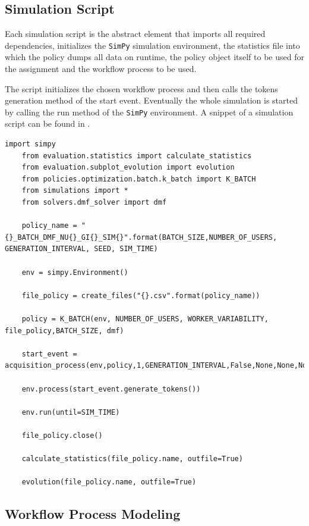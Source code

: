 \documentclass[draft=false]{seal_thesis}
\begin{document}
\subsection{Simulation Script}

Each simulation script is the abstract element that imports all required dependencies, initializes the \texttt{SimPy} simulation environment, the statistics file into which the policy dumps all data on runtime, the policy object itself to be used for the assignment and the workflow process to be used. 

The script initializes the chosen workflow process and then calls the tokens generation method of the start event. Eventually the whole simulation is started by calling the run method of the \texttt{SimPy} environment. A snippet of a simulation script can be found in .

\begin{lstlisting}[caption=Example of the structure of a simulation script. Here for the K-Batch policy using the \gls{dmf} solver,label=lst:simulation_script,style=CustomPython]
	import simpy
	from evaluation.statistics import calculate_statistics
	from evaluation.subplot_evolution import evolution
	from policies.optimization.batch.k_batch import K_BATCH
	from simulations import *
	from solvers.dmf_solver import dmf

	policy_name = "{}_BATCH_DMF_NU{}_GI{}_SIM{}".format(BATCH_SIZE,NUMBER_OF_USERS, GENERATION_INTERVAL, SEED, SIM_TIME)

	env = simpy.Environment()

	file_policy = create_files("{}.csv".format(policy_name))

	policy = K_BATCH(env, NUMBER_OF_USERS, WORKER_VARIABILITY, file_policy,BATCH_SIZE, dmf)

	start_event = acquisition_process(env,policy,1,GENERATION_INTERVAL,False,None,None,None)

	env.process(start_event.generate_tokens())

	env.run(until=SIM_TIME)

	file_policy.close()

	calculate_statistics(file_policy.name, outfile=True)

	evolution(file_policy.name, outfile=True)
\end{lstlisting}

\subsection{Workflow Process Modeling}
\end{document}
